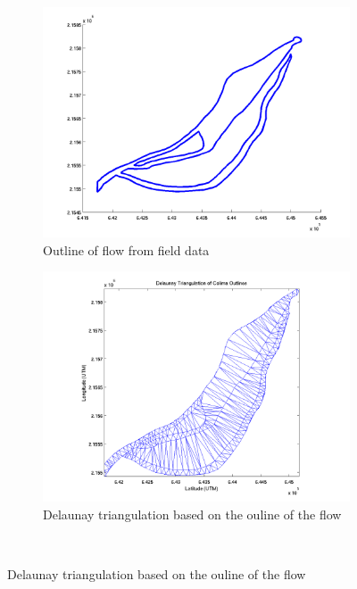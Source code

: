 \documentclass[letterpaper,10pt]{article}
\begin{document}
\begin{figure}
        \centering
        \begin{subfigure}[b]{0.45\textwidth}
                \includegraphics[width=\textwidth]{IMAGES/pics/outline.png}
                \caption{Outline of flow from field data}
                \label{fig:Outline}
        \end{subfigure}%
        \begin{subfigure}[b]{0.45\textwidth}
                \includegraphics[width=\textwidth]{IMAGES/pics/Delaunay_Triangulation_of_Colima_clean.png}
                \caption{Delaunay triangulation based on the ouline of the flow}
                \label{fig:Delaunay}
        \end{subfigure}\\

\end{figure}
\end{document}

